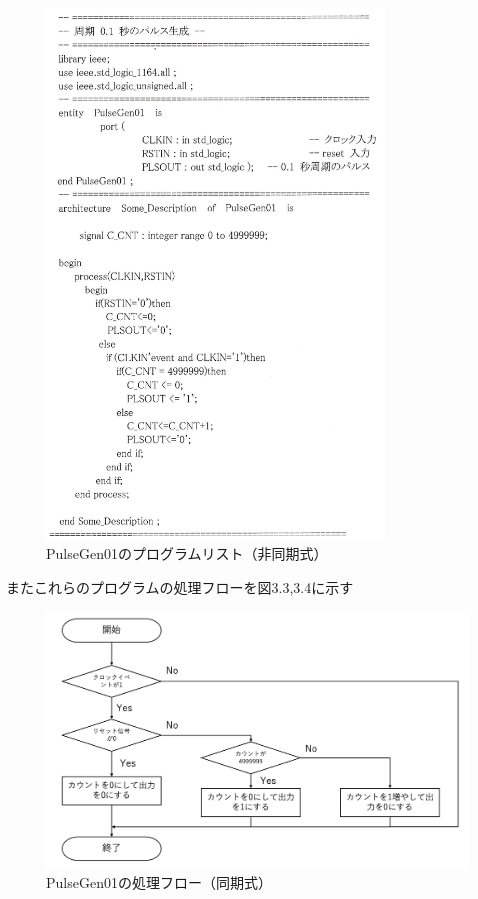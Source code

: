 \documentclass{jlreq}
\numberwithin{equation}{section}
\begin{document}
\begin{figure}[H]
  \centering
  \includegraphics[width=0.8\textwidth]{assets/PulseGen02.png}
  \caption{PulseGen01のプログラムリスト（非同期式）}
\end{figure}

またこれらのプログラムの処理フローを図3.3,3.4に示す

\begin{figure}[H]
  \centering
  \includegraphics[width=\textwidth]{assets/flowchart01.png}
  \caption{PulseGen01の処理フロー（同期式）}
\end{figure}
\end{document}
